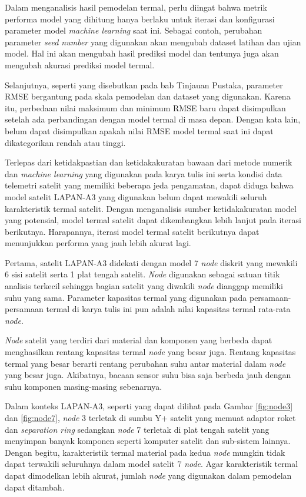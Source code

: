 Dalam menganalisis hasil pemodelan termal, perlu diingat bahwa metrik performa
model yang dihitung hanya berlaku untuk iterasi dan konfigurasi parameter model
\textit{machine learning} saat ini. Sebagai contoh, perubahan parameter
\textit{seed number} yang digunakan akan mengubah dataset latihan dan ujian
model. Hal ini akan mengubah hasil prediksi model dan tentunya juga akan mengubah
akurasi prediksi model termal. 

Selanjutnya, seperti yang disebutkan pada bab Tinjauan Pustaka, parameter RMSE
bergantung pada skala pemodelan dan dataset yang digunakan. Karena itu,
perbedaan nilai maksimum dan minimum RMSE baru dapat disimpulkan setelah ada
perbandingan dengan model termal di masa depan. Dengan kata lain, belum dapat
disimpulkan apakah nilai RMSE model termal saat ini dapat dikategorikan rendah
atau tinggi.

Terlepas dari ketidakpastian dan ketidakakuratan bawaan dari metode numerik dan
\textit{machine learning} yang digunakan pada karya tulis ini serta kondisi
data telemetri satelit yang memiliki beberapa jeda pengamatan, dapat diduga
bahwa model satelit LAPAN-A3 yang digunakan belum dapat mewakili seluruh
karakteristik termal satelit. Dengan menganalisis sumber ketidakakuratan model
yang potensial, model termal satelit dapat dikembangkan lebih lanjut pada
iterasi berikutnya. Harapannya, iterasi model termal satelit berikutnya dapat
menunjukkan performa yang jauh lebih akurat lagi.

Pertama, satelit LAPAN-A3 didekati dengan model 7 \textit{node} diskrit yang
mewakili 6 sisi satelit serta 1 plat tengah satelit. \textit{Node} digunakan sebagai
satuan titik analisis terkecil sehingga bagian satelit yang diwakili \textit{node}
dianggap memiliki suhu yang sama. Parameter kapasitas termal yang digunakan
pada persamaan-persamaan termal di karya tulis ini pun adalah nilai kapasitas
termal rata-rata \textit{node}. 

\textit{Node} satelit yang terdiri dari material dan komponen yang berbeda dapat
menghasilkan rentang kapasitas termal \textit{node} yang besar juga. Rentang kapasitas
termal yang besar berarti rentang perubahan suhu antar material dalam \textit{node} yang
besar juga. Akibatnya, bacaan sensor suhu bisa saja berbeda jauh dengan suhu
komponen masing-masing sebenarnya.

Dalam konteks LAPAN-A3, seperti yang dapat dilihat pada Gambar \ref{fig:node3} dan \ref{fig:node7}, \textit{node} 3 terletak di sumbu Y+ satelit yang memuat adaptor
roket dan \textit{separation ring} sedangkan \textit{node} 7 terletak di plat tengah
satelit yang menyimpan banyak komponen seperti komputer satelit dan sub-sistem
lainnya. Dengan begitu, karakteristik termal material pada kedua \textit{node} mungkin
tidak dapat terwakili seluruhnya dalam model satelit 7 \textit{node}. Agar karakteristik
termal dapat dimodelkan lebih akurat, jumlah \textit{node} yang digunakan dalam
pemodelan dapat ditambah.

